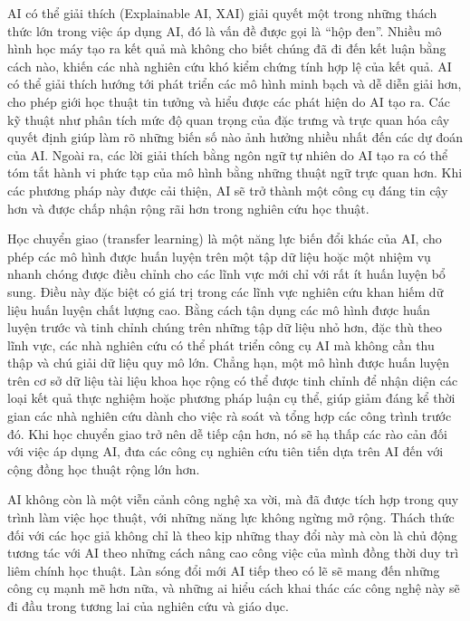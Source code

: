 AI có thể giải thích (Explainable AI, XAI) giải quyết một trong những thách thức lớn trong việc áp dụng AI, đó là vấn đề được gọi là ``hộp đen''. Nhiều mô hình học máy tạo ra kết quả mà không cho biết chúng đã đi đến kết luận bằng cách nào, khiến các nhà nghiên cứu khó kiểm chứng tính hợp lệ của kết quả. AI có thể giải thích hướng tới phát triển các mô hình minh bạch và dễ diễn giải hơn, cho phép giới học thuật tin tưởng và hiểu được các phát hiện do AI tạo ra. Các kỹ thuật như phân tích mức độ quan trọng của đặc trưng và trực quan hóa cây quyết định giúp làm rõ những biến số nào ảnh hưởng nhiều nhất đến các dự đoán của AI. Ngoài ra, các lời giải thích bằng ngôn ngữ tự nhiên do AI tạo ra có thể tóm tắt hành vi phức tạp của mô hình bằng những thuật ngữ trực quan hơn. Khi các phương pháp này được cải thiện, AI sẽ trở thành một công cụ đáng tin cậy hơn và được chấp nhận rộng rãi hơn trong nghiên cứu học thuật.

Học chuyển giao (transfer learning) là một năng lực biến đổi khác của AI, cho phép các mô hình được huấn luyện trên một tập dữ liệu hoặc một nhiệm vụ nhanh chóng được điều chỉnh cho các lĩnh vực mới chỉ với rất ít huấn luyện bổ sung. Điều này đặc biệt có giá trị trong các lĩnh vực nghiên cứu khan hiếm dữ liệu huấn luyện chất lượng cao. Bằng cách tận dụng các mô hình được huấn luyện trước và tinh chỉnh chúng trên những tập dữ liệu nhỏ hơn, đặc thù theo lĩnh vực, các nhà nghiên cứu có thể phát triển công cụ AI mà không cần thu thập và chú giải dữ liệu quy mô lớn. Chẳng hạn, một mô hình được huấn luyện trên cơ sở dữ liệu tài liệu khoa học rộng có thể được tinh chỉnh để nhận diện các loại kết quả thực nghiệm hoặc phương pháp luận cụ thể, giúp giảm đáng kể thời gian các nhà nghiên cứu dành cho việc rà soát và tổng hợp các công trình trước đó. Khi học chuyển giao trở nên dễ tiếp cận hơn, nó sẽ hạ thấp các rào cản đối với việc áp dụng AI, đưa các công cụ nghiên cứu tiên tiến dựa trên AI đến với cộng đồng học thuật rộng lớn hơn.

AI không còn là một viễn cảnh công nghệ xa vời, mà đã được tích hợp trong quy trình làm việc học thuật, với những năng lực không ngừng mở rộng. Thách thức đối với các học giả không chỉ là theo kịp những thay đổi này mà còn là chủ động tương tác với AI theo những cách nâng cao công việc của mình đồng thời duy trì liêm chính học thuật. Làn sóng đổi mới AI tiếp theo có lẽ sẽ mang đến những công cụ mạnh mẽ hơn nữa, và những ai hiểu cách khai thác các công nghệ này sẽ đi đầu trong tương lai của nghiên cứu và giáo dục.

